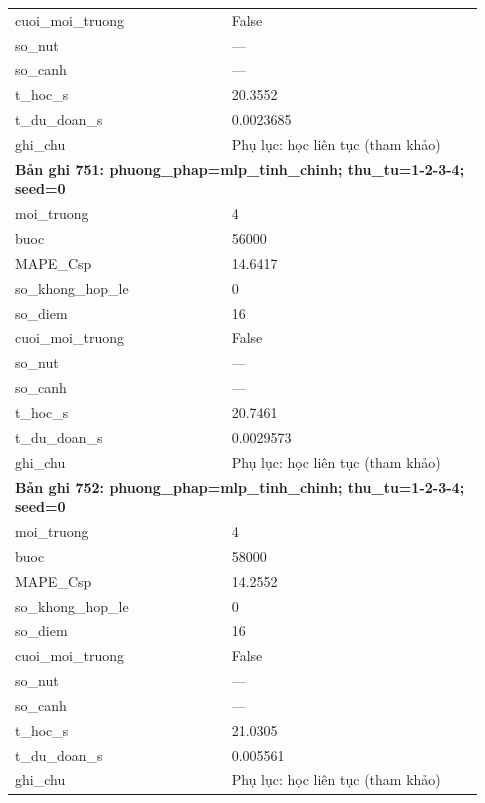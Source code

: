 \begin{longtable}{p{0.43\linewidth}p{0.50\linewidth}}
cuoi\_\allowbreak moi\_\allowbreak truong & False \\
so\_\allowbreak nut & — \\
so\_\allowbreak canh & — \\
t\_\allowbreak hoc\_\allowbreak s & 20.3552 \\
t\_\allowbreak du\_\allowbreak doan\_\allowbreak s & 0.0023685 \\
ghi\_\allowbreak chu & Phụ lục: học liên tục (tham khảo) \\
\midrule
\multicolumn{2}{p{0.95\linewidth}}{\textbf{Bản ghi 751: phuong\_phap=mlp\_tinh\_chinh; thu\_tu=1-2-3-4; seed=0}} \\
moi\_\allowbreak truong & 4 \\
buoc & 56000 \\
MAPE\_\allowbreak Csp & 14.6417 \\
so\_\allowbreak khong\_\allowbreak hop\_\allowbreak le & 0 \\
so\_\allowbreak diem & 16 \\
cuoi\_\allowbreak moi\_\allowbreak truong & False \\
so\_\allowbreak nut & — \\
so\_\allowbreak canh & — \\
t\_\allowbreak hoc\_\allowbreak s & 20.7461 \\
t\_\allowbreak du\_\allowbreak doan\_\allowbreak s & 0.0029573 \\
ghi\_\allowbreak chu & Phụ lục: học liên tục (tham khảo) \\
\midrule
\multicolumn{2}{p{0.95\linewidth}}{\textbf{Bản ghi 752: phuong\_phap=mlp\_tinh\_chinh; thu\_tu=1-2-3-4; seed=0}} \\
moi\_\allowbreak truong & 4 \\
buoc & 58000 \\
MAPE\_\allowbreak Csp & 14.2552 \\
so\_\allowbreak khong\_\allowbreak hop\_\allowbreak le & 0 \\
so\_\allowbreak diem & 16 \\
cuoi\_\allowbreak moi\_\allowbreak truong & False \\
so\_\allowbreak nut & — \\
so\_\allowbreak canh & — \\
t\_\allowbreak hoc\_\allowbreak s & 21.0305 \\
t\_\allowbreak du\_\allowbreak doan\_\allowbreak s & 0.005561 \\
ghi\_\allowbreak chu & Phụ lục: học liên tục (tham khảo) \\

\end{longtable}
